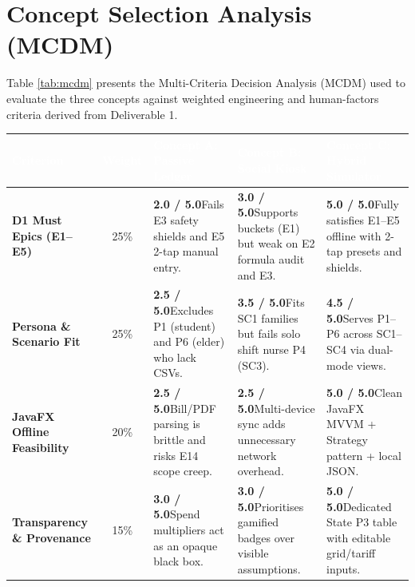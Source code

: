 \documentclass[12pt, a4paper]{article}
\begin{document}
\section{Concept Selection Analysis (MCDM)}
Table \ref{tab:mcdm} presents the Multi-Criteria Decision Analysis (MCDM) used to evaluate the three concepts against weighted engineering and human-factors criteria derived from Deliverable 1.

\begin{table}[H]
\centering
\small
\renewcommand{\arraystretch}{1.45}
\begin{tabularx}{\textwidth}{@{} >{\bfseries}p{3.0cm} c X X X @{}}
\toprule
\rowcolor{AcademicNavy}
\textcolor{white}{Criterion} & \textcolor{white}{Weight} & \textcolor{white}{Concept A: Passive Ledger} & \textcolor{white}{Concept B: Social Kiosk} & \textcolor{white}{Concept C: Hybrid Simulator} \\
\midrule
D1 Must Epics (E1--E5) & 25\% & \textbf{2.0 / 5.0}\newline Fails E3 safety shields and E5 2-tap manual entry. & \textbf{3.0 / 5.0}\newline Supports buckets (E1) but weak on E2 formula audit and E3. & \textbf{5.0 / 5.0}\newline Fully satisfies E1--E5 offline with 2-tap presets and shields. \\
\rowcolor{RowAlt}
Persona \& Scenario Fit & 25\% & \textbf{2.5 / 5.0}\newline Excludes P1 (student) and P6 (elder) who lack CSVs. & \textbf{3.5 / 5.0}\newline Fits SC1 families but fails solo shift nurse P4 (SC3). & \textbf{4.5 / 5.0}\newline Serves P1--P6 across SC1--SC4 via dual-mode views. \\
JavaFX Offline Feasibility & 20\% & \textbf{2.5 / 5.0}\newline Bill/PDF parsing is brittle and risks E14 scope creep. & \textbf{2.5 / 5.0}\newline Multi-device sync adds unnecessary network overhead. & \textbf{5.0 / 5.0}\newline Clean JavaFX MVVM + Strategy pattern + local JSON. \\
\rowcolor{RowAlt}
Transparency \& Provenance & 15\% & \textbf{3.0 / 5.0}\newline Spend multipliers act as an opaque black box. & \textbf{3.0 / 5.0}\newline Prioritises gamified badges over visible assumptions. & \textbf{5.0 / 5.0}\newline Dedicated State P3 table with editable grid/tariff inputs. \\

\end{tabularx}
\end{table}
\end{document}
